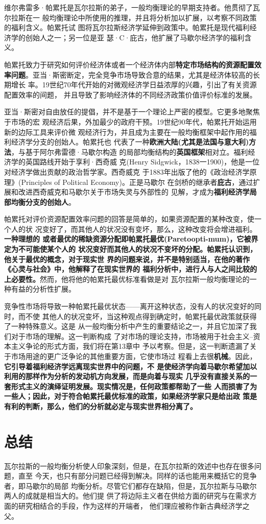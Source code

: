 维尔弗雷多·帕累托是瓦尔拉斯的弟子，一般均衡理论的早期支持者。他贯彻了瓦尔拉斯在一
般均衡理论中所使用的推理，并且将分析加以扩展，以考察不同政策的福利含义。帕累托试
图将瓦尔拉斯经济学延伸到政策中。帕累托是现代福利经济学的创始人之一；另一位是亚
瑟·C·庇古，他扩展了马歇尔经济学的福利含义。

帕累托致力于研究如何评价经济体或者一个经济体内部\textbf{特定市场结构的资源配置效
  率问题}。亚当·斯密断定，完全竞争市场导致合意的结果，尤其是经济体较高的长期增长
率。19世纪70年代开始的对微观经济学日益浓厚的兴趣，引出了有关资源配置效率的间题，
并且导致了影响经济体的不同经济政策价值评价标准的发展。

亚当·斯密对自由放任的提倡，并不是基于一个理论上严密的模型。它更多地聚焦于市场的宏
观经济后果，外加最少的政府干预。19世纪90年代，帕累托开始运用新的边际工具来评价微
观经济行为，并且成为主要在一般均衡框架中起作用的福利经济学分支的创始人。帕累托也
代表了一种\textbf{欧洲大陆(尤其是法国与意大利)方法}，与基于阿尔弗雷德·马歇尔构造
的局部均衡结构的\textbf{英国框架}相对立。福利经济学的英国路线开始于享利·西奇威
克(Henry Sidgwick，1838一1900)，他是一位对经济学做出贡献的政治哲学家。西奇威克
于1883年出版了他的《政治经济学原理》(Principles of Political Economy)。正是马歇尔
在剑桥的继承者\textbf{庇古}，通过扩展和改进西奇威克和马歇尔关于市场失灵与外部性的
见解，才成为\textbf{福利经济学局部均衡分支的创始人}。

帕累托对评价资源配置效率问题的回答是简单的，如果资源配置的某种改变，使一个人的状
况变好了，而其他人的状况没有变坏，那么，这种改变将会增进福利。\textbf{一种理想的
  或者最优的稀缺资源分配即帕累托最优(Paretoopti-mum)，它被界定为不可能使某个人的
  状况变好而其他人的状况不变坏的分配。帕累托认识到，他关于最优的概念，对于现实世
  界的问题来说，并不是特别适当，在他的著作《心灵与社会》中，他解释了在现实世界的
  福利分析中，进行人与人之间比较的上必要性。}然而，他将他的帕累托最优标准看做是对
瓦尔拉斯一般均衡理论的一种有益的分析性扩展。

竞争性市场将导致一种帕累托最优状态——离开这种状态，没有人的状况变好的同时，而不使
其他人的状况变坏，当这种观点得到确定时，帕累托最优政策就获得了一种特殊意义。这是
从一般均衡分析中产生的重要结论之一，并且它加深了我们对于市场的理解。这一判断构成
了对市场的理论支持，市场被用于社会主义--资本主义争论的形式方面，我们将在第13章中
予以考察。但是，这一判断遗漏了关于市场用途的更广泛争论的其他重要方面，它使市场过
程看上去很\textbf{机械}。因此，\textbf{它引导着福利经济学远离现实世界中的问题，不
  是使经济学向着马歇尔希望加以利用的那样作为分析的发动机方向发展，而是向着与现实
  几乎没有直接关系的一套形式主义的演绎证明发展。现实情况是，任何政策都帮助了一些
  人而损害了为一些人；因此，对于符合帕累托最优标准的政策，如果经济学家只是给出政
  策是有利的判断，那么，他们的分析就必定与现实世界相分离了。}

\section{总结}

瓦尔拉斯的一般均衡分析使人印象深刻，但是，在瓦尔拉斯的效述中也存在很多问题，直至
今天，也只有部分问题已经得到解决。同样的话也能用来概括它的竞争者，即马歇尔的局部
均衡分析。尽管它们都存在缺陷，但是，瓦尔拉斯与马歇尔两人的成就是相当大的。他们提
供了将边际主义者在供给方面的研究与在需求方面的研究相结合的手段，作为这样的开端者，
他们理应被称作新古典经济学之父。



